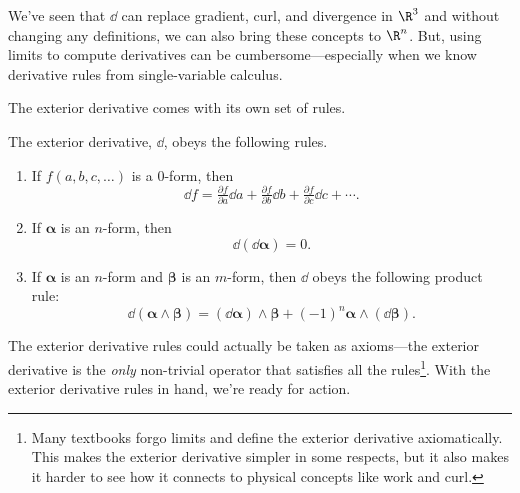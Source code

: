 We've seen that $\dd$ can replace gradient, curl, and divergence in $\R^3$
and without changing any definitions, we can also bring these concepts to $\R^n$.
But, using limits to compute derivatives can be cumbersome---especially when
we know derivative rules from single-variable calculus.

The exterior derivative comes with its own set of rules.

\begin{definition}
	The exterior derivative, $\dd$, obeys the following rules.
	\begin{enumerate}
		\item If $f(a,b,c,\ldots)$ is a 0-form, then
		\[
			\dd f = \tfrac{\partial f}{\partial a} \dd a+
			\tfrac{\partial f}{\partial b} \dd b + 
			\tfrac{\partial f}{\partial c} \dd c + \cdots.
		\]
		\item If $\bm\alpha$ is an $n$-form, then
		\[
			\dd(\dd \bm\alpha) = 0.
		\]
		\item If $\bm\alpha$ is an $n$-form and $\bm\beta$
		is an $m$-form, then $\dd$ obeys the following product
		rule:
		\[
			\dd(\bm\alpha\wedge \bm\beta)= 
			(\dd \bm\alpha)\wedge \bm\beta + (-1)^n \bm\alpha\wedge (\dd \bm\beta).
		\]
	\end{enumerate}
\end{definition}

The exterior derivative rules could actually be taken as axioms---the exterior
derivative is the \emph{only} non-trivial operator that satisfies all
the rules\footnote{
Many textbooks forgo limits and define the exterior derivative axiomatically.
This makes the exterior derivative simpler in some respects, but it also
makes it harder to see how it connects to physical concepts like work
and curl.}.  With the exterior derivative rules in hand, we're ready for action.

